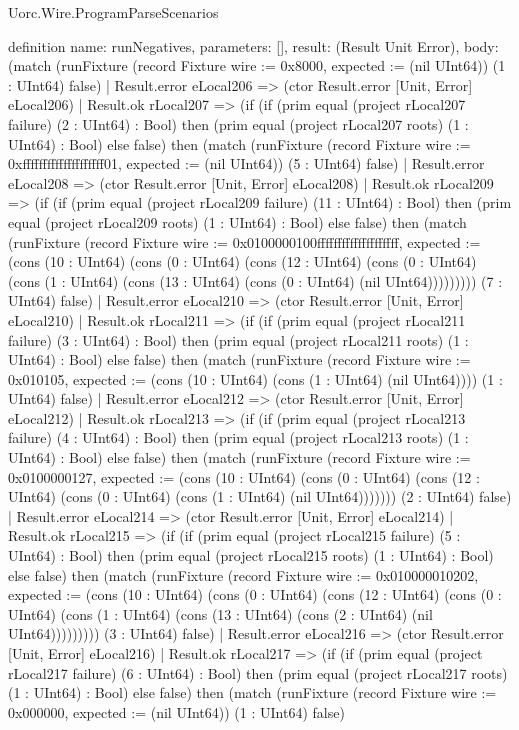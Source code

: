 \begin{lexlean}{Uorc.Wire.ProgramParseScenarios}
\begin{semanticmodule}
definition{
  name: runNegatives,
  parameters: [],
  result: (Result Unit Error),
  body: (match (runFixture (record Fixture {wire := 0x8000, expected := (nil UInt64)}) (1 : UInt64) false)
    | Result.error eLocal206 => (ctor Result.error [Unit, Error] eLocal206)
    | Result.ok rLocal207 => (if (if (prim equal (project rLocal207 failure) (2 : UInt64) : Bool) then (prim equal (project rLocal207 roots) (1 : UInt64) : Bool) else false) then (match (runFixture (record Fixture {wire := 0xffffffffffffffffffff01, expected := (nil UInt64)}) (5 : UInt64) false)
      | Result.error eLocal208 => (ctor Result.error [Unit, Error] eLocal208)
      | Result.ok rLocal209 => (if (if (prim equal (project rLocal209 failure) (11 : UInt64) : Bool) then (prim equal (project rLocal209 roots) (1 : UInt64) : Bool) else false) then (match (runFixture (record Fixture {wire := 0x0100000100ffffffffffffffffffff, expected := (cons (10 : UInt64) (cons (0 : UInt64) (cons (12 : UInt64) (cons (0 : UInt64) (cons (1 : UInt64) (cons (13 : UInt64) (cons (0 : UInt64) (nil UInt64))))))))}) (7 : UInt64) false)
        | Result.error eLocal210 => (ctor Result.error [Unit, Error] eLocal210)
        | Result.ok rLocal211 => (if (if (prim equal (project rLocal211 failure) (3 : UInt64) : Bool) then (prim equal (project rLocal211 roots) (1 : UInt64) : Bool) else false) then (match (runFixture (record Fixture {wire := 0x010105, expected := (cons (10 : UInt64) (cons (1 : UInt64) (nil UInt64)))}) (1 : UInt64) false)
          | Result.error eLocal212 => (ctor Result.error [Unit, Error] eLocal212)
          | Result.ok rLocal213 => (if (if (prim equal (project rLocal213 failure) (4 : UInt64) : Bool) then (prim equal (project rLocal213 roots) (1 : UInt64) : Bool) else false) then (match (runFixture (record Fixture {wire := 0x0100000127, expected := (cons (10 : UInt64) (cons (0 : UInt64) (cons (12 : UInt64) (cons (0 : UInt64) (cons (1 : UInt64) (nil UInt64))))))}) (2 : UInt64) false)
            | Result.error eLocal214 => (ctor Result.error [Unit, Error] eLocal214)
            | Result.ok rLocal215 => (if (if (prim equal (project rLocal215 failure) (5 : UInt64) : Bool) then (prim equal (project rLocal215 roots) (1 : UInt64) : Bool) else false) then (match (runFixture (record Fixture {wire := 0x010000010202, expected := (cons (10 : UInt64) (cons (0 : UInt64) (cons (12 : UInt64) (cons (0 : UInt64) (cons (1 : UInt64) (cons (13 : UInt64) (cons (2 : UInt64) (nil UInt64))))))))}) (3 : UInt64) false)
              | Result.error eLocal216 => (ctor Result.error [Unit, Error] eLocal216)
              | Result.ok rLocal217 => (if (if (prim equal (project rLocal217 failure) (6 : UInt64) : Bool) then (prim equal (project rLocal217 roots) (1 : UInt64) : Bool) else false) then (match (runFixture (record Fixture {wire := 0x000000, expected := (nil UInt64)}) (1 : UInt64) false)
}
\end{semanticmodule}
\end{lexlean}
